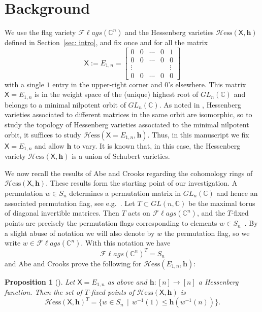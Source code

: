 \documentclass[11pt]{amsart}
\theoremstyle{plain}
\newtheorem{prop}[thm]{Proposition}
\theoremstyle{definition}
\newcommand{\Hess}{\mathcal{H}\mathrm{ess}}
\newcommand{\mx}{\mathsf{X}}
\newcommand{\hess}{{\mathbf h}}
\newcommand{\Fl}{\mathcal{F}\ell ags}
\newcommand{\C}{\mathbb{C}}           %
\numberwithin{equation}{section}
\begin{document}
\section{Background}\label{sec:background}

We use the flag variety $\Fl(\C^n)$ and the Hessenberg varieties $\Hess(\mx,\hess)$ defined in Section~\ref{sec: intro}, and fix once and for all the matrix
\[
\mx := E_{1,n} = 
\begin{bmatrix}
0 & 0 & \cdots & 0 & 1 \\
0 & 0 & \cdots& 0 & 0 \\
\vdots &  & & & \vdots \\
0 & 0 & \cdots & 0 & 0 
\end{bmatrix} 
\]
with a single $1$ entry in the upper-right corner and $0$'s elsewhere. This matrix $\mx = E_{1,n}$ is in the weight space of the (unique) highest root of $GL_n(\C)$ and belongs to a minimal nilpotent orbit of $GL_n(\C)$. As noted in \cite[Lemma 1]{AbeCrooks}, Hessenberg varieties associated to different matrices in the same orbit are isomorphic, so to study the topology of Hessenberg varieties associated to the minimal nilpotent orbit, it suffices to study $\Hess(\mx=E_{1,n},\hess)$. Thus, in this manuscript we fix $\mx = E_{1,n}$ and allow $\hess$ to vary. 
It is known that, in this case, the Hessenberg variety $\Hess(\mx,\hess)$ is a union of Schubert varieties. 

We now recall the results of Abe and Crooks \cite{AbeCrooks}
regarding the cohomology rings of $\Hess(\mx, \hess)$. These results form the starting point of our investigation. 
A permutation $w \in S_n$ determines a permutation matrix in $GL_n(\C)$ and hence an associated permutation flag, see e.g.~\cite[Section 1.3.3]{Handbook-Hess}. 
Let $T \subset GL(n,\C)$ be the maximal torus of diagonal invertible matrices. Then $T$ acts on $\Fl(\C^n)$, and the $T$-fixed points are precisely the permutation flags corresponding to elements $w \in S_n$~\cite[Exercise 5.63]{Handbook-Hess}. By a slight abuse of notation we will also denote by $w$ the permutation flag, so we write $w \in \Fl(\C^n)$. With this notation we have 
\[
\Fl(\C^n)^T = S_n
\]
and Abe and Crooks prove the following for $\Hess(E_{1,n},\hess)$:


\begin{prop}[{\cite[Proposition 3]{AbeCrooks}}]
\label{prop: fixed points}
Let $\mx = E_{1,n}$ as above and $\hess:[n] \to [n]$ a Hessenberg function. 
Then the set of $T$-fixed points of $\Hess(\mx, \hess)$ is
\begin{equation}\label{eq: hess fixed points}
\Hess(\mx, \hess)^T = \{w\in S_n \, \mid \, w^{-1}(1) \leq \hess(w^{-1}(n)) \}.
\end{equation} 
\end{prop} 
\end{document}
